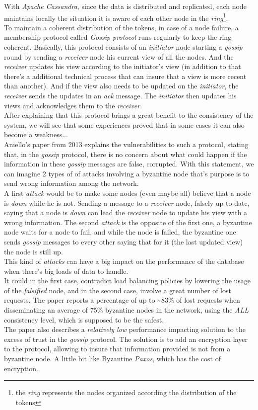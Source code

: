 \documentclass[a4paper]{report}
\newcommand{\ca}{\emph{Apache Cassandra\xspace}}
\newcommand{\px}{\emph{Paxos\xspace}}
\begin{document}
With \ca{}, since the data is distributed and replicated, each node maintains locally the situation it is aware of each other node in the \emph{ring}\footnote{the \emph{ring} represents the nodes organized according the distribution of the tokens}. \\
To maintain a coherent distribution of the tokens, in case of a node failure, a membership protocol called \emph{Gossip protocol} runs regularly to keep the ring coherent. Basically, this protocol consists of an \emph{initiator} node starting a \emph{gossip} round by sending a \emph{receiver} node his current view of all the nodes. And the \emph{receiver} updates his view according to the initiator's view (in addition to that there's a additional technical process that can insure that a view is more recent than another). And if the view also needs to be updated on the \emph{initiator}, the \emph{receiver} sends the updates in an \emph{ack} message. The \emph{initiator} then updates his views and acknowledges them to the \emph{receiver}.\\
After explaining that this protocol brings a great benefit to the consistency of the system, we will see that some experiences proved that in some cases it can also become a weakness...\\
Aniello's paper\cite{Aniello13} from 2013 explains the vulnerabilities to such a protocol, stating that, in the \emph{gossip} protocol, there is no concern about what could happen if the information in these \emph{gossip} messages are false, corrupted. With this statement, we can imagine 2 types of of attacks involving a byzantine node that's purpose is to send wrong information among the network.\\
A first \emph{attack} would be to make some nodes (even maybe all) believe that a node is \emph{down} while he is not. Sending a message to a \emph{receiver} node, falsely up-to-date, saying that a node is \emph{down} can lead the \emph{receiver} node to update his view with a wrong information. The second \emph{attack} is the opposite of the first one, a byzantine node waits for a node to fail, and while the node is failed, the byzantine one sends \emph{gossip} messages to every other saying that for it (the last updated view) the node is still up.\\
This kind of \emph{attacks} can have a big impact on the performance of the database when there's big loads of data to handle. \\
It could in the first case, contradict load balancing policies by lowering the usage of the \emph{falsified} node, and in the second case, involve a great number of lost requests. The paper reports a percentage of up to \textasciitilde{}83\% of lost requests when disseminating an average of 75\% byzantine nodes in the network, using the \emph{ALL} consistency level, which is supposed to be the safest. \\
The paper also describes a \emph{relatively low} performance impacting solution to the excess of trust in the \emph{gossip} protocol. The solution is to add an encryption layer to the protocol, allowing to insure that information provided is not from a byzantine node. A little bit like Byzantine \px{}\cite{Martin}, which has the cost of encryption.
\end{document}
